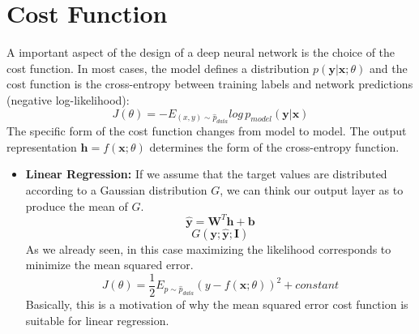 \section{Cost Function}
A important aspect of the design of a deep neural network is the choice of the cost function. In most cases, the model defines a distribution $p(\textbf{y} | \textbf{x}; \theta)$ and the cost function is the cross-entropy between training labels and network predictions (negative log-likelihood):
\[J(\theta) = - E_{(x,y) \sim \hat{p}_{data}}log\, p_{model}(\textbf{y}|\textbf{x})\]
The specific form of the cost function changes from model to model. The output representation $\textbf{h} = f(\textbf{x};\theta)$ determines the form of the cross-entropy function.
\begin{itemize}
    \item \textbf{Linear Regression:} If we assume that the target values are distributed according to a Gaussian distribution $G$, we can think our output layer as to produce the mean of $G$.
    \[\hat{\textbf{y}} = \textbf{W}^{T}\textbf{h} + \textbf{b}\]
    \[G(\textbf{y};\hat{\textbf{y}}; \textbf{I})\]
    As we already seen, in this case maximizing the likelihood corresponds to minimize the mean squared error.
    \[J(\theta) = \frac{1}{2}E_{p \sim \hat{p}_{data}}(y - f(\textbf{x}; \theta))^{2} + constant\]
    Basically, this is a motivation of why the mean squared error cost function is suitable for linear regression.


\end{itemize}
